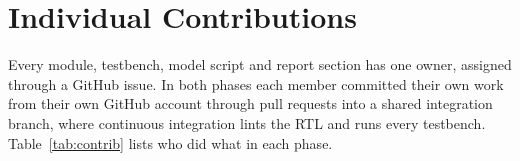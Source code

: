
\section{Individual Contributions}
Every module, testbench, model script and report section has one owner, assigned through a GitHub issue. In both phases each member committed their own work from their own GitHub account through pull requests into a shared integration branch, where continuous integration lints the RTL and runs every testbench. Table~\ref{tab:contrib} lists who did what in each phase.


